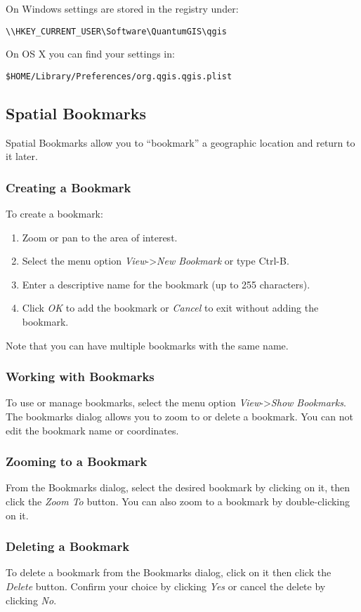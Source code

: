 On Windows settings are stored in the registry under:
\begin{verbatim}
\\HKEY_CURRENT_USER\Software\QuantumGIS\qgis
\end{verbatim}

On OS X you can find your settings in:
\begin{verbatim}
$HOME/Library/Preferences/org.qgis.qgis.plist
\end{verbatim}


\subsection{Spatial Bookmarks}\label{sec:bookmarks}

Spatial Bookmarks allow you to ``bookmark'' a geographic location and return to it later.

\subsubsection{Creating a Bookmark}
To create a bookmark:
\begin{enumerate}
\item Zoom or pan to the area of interest.
\item Select the menu option \textit{View}->\textit{New Bookmark} or type Ctrl-B.
\item Enter a descriptive name for the bookmark (up to 255 characters).
\item Click \textit{OK} to add the bookmark or \textit{Cancel} to exit without adding the bookmark.
\end{enumerate}

Note that you can have multiple bookmarks with the same name.

\subsubsection{Working with Bookmarks}
To use or manage bookmarks, select the menu option \textit{View}->\textit{Show Bookmarks}.
The bookmarks dialog allows you to zoom to or delete a bookmark.
You can not edit the bookmark name or coordinates.

\subsubsection{Zooming to a Bookmark}
From the Bookmarks dialog, select the desired bookmark by clicking on it, 
then click the \textit{Zoom To} button.
You can also zoom to a bookmark by double-clicking on it.

\subsubsection{Deleting a Bookmark}
To delete a bookmark from the Bookmarks dialog, click on it then click the \textit{Delete} button.
Confirm your choice by clicking \textit{Yes} or cancel the delete by clicking \textit{No}.